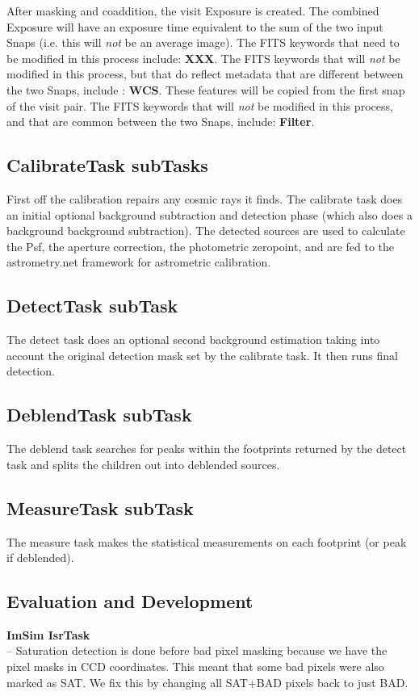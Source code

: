 \documentclass[12pt]{article}
\begin{document}
After masking and coaddition, the visit Exposure is created.  The
combined Exposure will have an exposure time equivalent to the sum of
the two input Snaps (i.e. this will {\it not} be an average image).
The FITS keywords that need to be modified in this process include:
{\bf XXX}.  The FITS keywords that will {\it not} be modified in this
process, but that do reflect metadata that are different between the
two Snaps, include : {\bf WCS}.  These features will be copied from
the first snap of the visit pair.  The FITS keywords that will {\it
  not} be modified in this process, and that are common between the
two Snaps, include: {\bf Filter}.

\subsection{CalibrateTask subTasks} 
First off the calibration repairs any cosmic rays it finds.
The calibrate task does an initial optional background subtraction and detection phase (which also does a background background subtraction).  The detected sources are used to calculate
the Psf, the aperture correction, the photometric zeropoint, and are fed to the astrometry.net framework for astrometric
calibration.

\subsection{DetectTask subTask}
The detect task does an optional second background estimation taking into account the original detection mask set by the calibrate task.
It then runs final detection.

\subsection{DeblendTask subTask}
The deblend task searches for peaks within the footprints returned by the detect task and splits the children out into deblended sources.

\subsection{MeasureTask subTask}
The measure task makes the statistical measurements on each footprint (or peak if deblended).

\subsection{Evaluation and Development}
{\bf ImSim IsrTask}\\
-- Saturation detection is done before bad pixel masking because we have the pixel masks in CCD coordinates.
This meant that some bad pixels were also marked as SAT.  We fix this by changing all SAT+BAD pixels back to just BAD.
\end{document}
